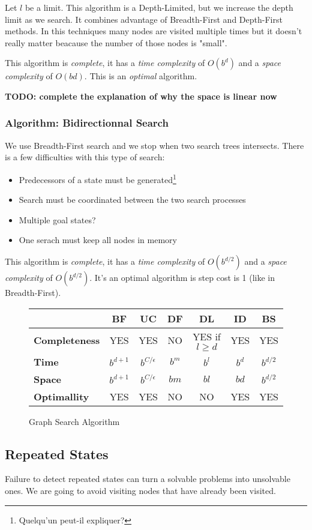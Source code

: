 Let $l$ be a limit. This algorithm is a Depth-Limited, but we increase the depth limit as we search. It combines advantage of Breadth-First and Depth-First methods. In this techniques many nodes are visited multiple times but it doesn't really matter beacause the number of those nodes is "small".

This algorithm is \textit{complete}, it has a \textit{time complexity} of $O(b^d)$ and a \textit{space complexity} of $O(bd)$. This is an \textit{optimal} algorithm.

\textbf{TODO: complete the explanation of why the space is linear now}

\subsubsection{Algorithm: Bidirectionnal Search}

We use Breadth-First search and we stop when two search trees intersects. There is a few difficulties with this type of search:
\begin{itemize}
\item Predecessors of a state must be generated\footnote{Quelqu'un peut-il expliquer?}
\item Search must be coordinated between the two search processes
\item Multiple goal states?
\item One serach must keep all nodes in memory
\end{itemize} 

This algorithm is \textit{complete}, it has a \textit{time complexity} of $O(b^{d/2})$ and a \textit{space complexity} of $O(b^{d/2})$. It's an optimal algorithm is step cost is 1 (like in Breadth-First). 

\begin{figure}[H]
\centering
\begin{tabular}{|l|cccccc|}
\hline
& \textbf{BF} & \textbf{UC} & \textbf{DF} & \textbf{DL} & \textbf{ID} & \textbf {BS}\\
\hline
\textbf{Completeness} & YES & YES & NO & YES if $l\geq d$ & YES & YES\\
\textbf{Time} & $b^{d+1}$ & $b^{C/\epsilon}$ & $b^m$ & $b^l$ & $b^d$ & $b^{d/2}$\\
\textbf{Space} & $b^{d+1}$ & $b^{C/\epsilon}$ & $bm$ & $bl$ & $bd$ & $b^{d/2}$ \\
\textbf{Optimallity} & YES & YES & NO & NO & YES & YES \\
\hline
\end{tabular}
\caption{Graph Search Algorithm}
\end{figure}

\subsection{Repeated States}

Failure to detect repeated states can turn a solvable problems into unsolvable ones. We are going to avoid visiting nodes that have already been visited. 
